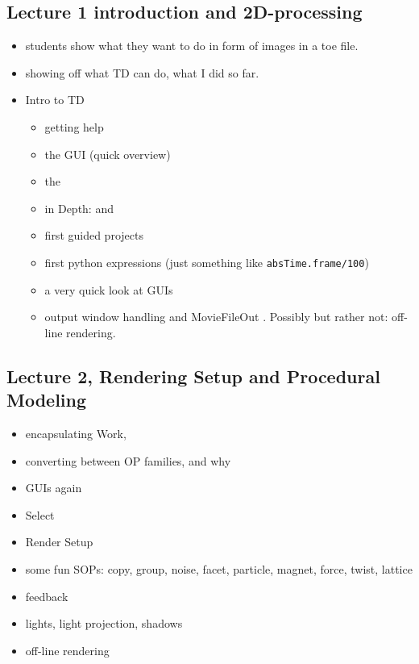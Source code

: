 \subsection{Lecture 1 introduction and 2D-processing} %
\label{sub:lecture_1}
\begin{itemize}
	\item students show what they want to do in form of images in a toe file.
	\item showing off what TD can do, what I did so far.
	\item Intro to TD
		\begin{itemize}
		\item getting help
		\item the GUI (quick overview)
		\item the \OPs
		\item in Depth: \TOPs and \CHOPs
		\item first guided projects
		\item first python expressions (just something like \verb|absTime.frame/100|)
		\item a very quick look at GUIs
		\item output window handling and MovieFileOut \TOP. Possibly but rather not: off-line rendering.
		\end{itemize}
\end{itemize}

\subsection{Lecture 2, Rendering Setup and Procedural Modeling}
\label{sub:lecture_2}
\begin{itemize}
	\item encapsulating Work, \COMPs
	\item converting between OP families, and why
	\item GUIs again
	\item Select \OPs
	\item Render Setup
	\item some fun SOPs: copy, group, noise, facet, particle, magnet, force, twist, lattice
	\item feedback \TOP
	\item lights, light projection, shadows
	\item off-line rendering
\end{itemize}

